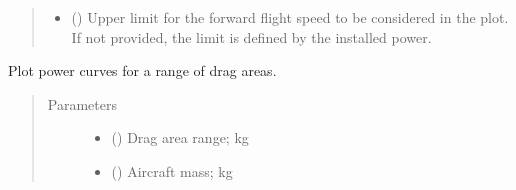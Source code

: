 \documentclass[letterpaper,10pt,english]{sphinxmanual}
\begin{document}
\begin{fulllineitems}
\begin{fulllineitems}
\begin{quote}
\begin{description}
\begin{itemize}
\item {} 
\sphinxAtStartPar
{} (\sphinxstyleliteralemphasis{\sphinxupquote{, }}) \textendash{} Upper limit for the forward flight speed to be considered in the
plot. If not provided, the limit is defined by the installed power.

\end{itemize}

\end{description}\end{quote}

\end{fulllineitems}


\begin{fulllineitems}
\label{\detokenize{modules/helicopter:helicopter.Helicopter.plot_power_sweep_drag_area}}
\sphinxAtStartPar
Plot power curves for a range of drag areas.
\begin{quote}\begin{description}
\item[{Parameters}] \leavevmode\begin{itemize}
\item {} 
\sphinxAtStartPar
{} (\sphinxstyleliteralemphasis{\sphinxupquote{(}}\sphinxstyleliteralemphasis{\sphinxupquote{, }}\sphinxstyleliteralemphasis{\sphinxupquote{, }}\sphinxstyleliteralemphasis{\sphinxupquote{)}}) \textendash{} Drag area range; kg

\item {} 
\sphinxAtStartPar
{} () \textendash{} Aircraft mass; kg


\end{itemize}
\end{description}
\end{quote}
\end{fulllineitems}
\end{fulllineitems}
\end{document}
